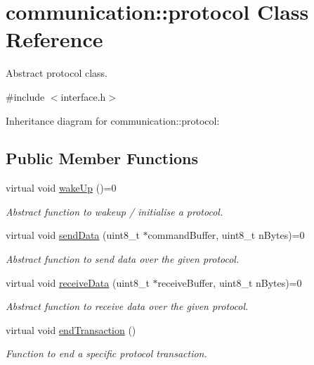 \hypertarget{classcommunication_1_1protocol}{}\section{communication\+:\+:protocol Class Reference}
\label{classcommunication_1_1protocol}


Abstract protocol class.  




{\ttfamily \#include $<$interface.\+h$>$}



Inheritance diagram for communication\+:\+:protocol\+:
\subsection*{Public Member Functions}
\begin{DoxyCompactItemize}
\item 
\mbox{\label{classcommunication_1_1protocol_aefe3def7b92b2eae8c98bfc542e27078}} 
virtual void \hyperlink{classcommunication_1_1protocol_aefe3def7b92b2eae8c98bfc542e27078}{wake\+Up} ()=0
\begin{DoxyCompactList}\small\item\em Abstract function to wakeup / initialise a protocol. \end{DoxyCompactList}\item 
virtual void \hyperlink{classcommunication_1_1protocol_a1745c4aac1b27bac2d350be54fedc388}{send\+Data} (uint8\+\_\+t $\ast$command\+Buffer, uint8\+\_\+t n\+Bytes)=0
\begin{DoxyCompactList}\small\item\em Abstract function to send data over the given protocol. \end{DoxyCompactList}\item 
virtual void \hyperlink{classcommunication_1_1protocol_ad0d43530ae3db2b14a6e9c1f77aa530a}{receive\+Data} (uint8\+\_\+t $\ast$receive\+Buffer, uint8\+\_\+t n\+Bytes)=0
\begin{DoxyCompactList}\small\item\em Abstract function to receive data over the given protocol. \end{DoxyCompactList}\item 
virtual void \hyperlink{classcommunication_1_1protocol_a09be73a92665c2adb539d20b754ce19c}{end\+Transaction} ()
\begin{DoxyCompactList}\small\item\em Function to end a specific protocol transaction. \end{DoxyCompactList}\end{DoxyCompactItemize}


